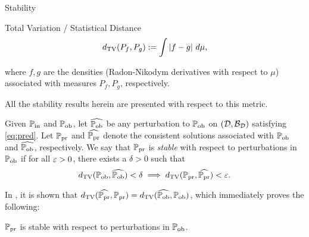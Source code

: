 \begin{frame}[t]{Stability}

\begin{defn}{Total Variation / Statistical Distance}
	\begin{equation}\label{eq:tv}
		d_{\text{TV}} (P_f, P_g) := \int \left\vert f - g\right\vert \, d\mu,
	\end{equation}
\end{defn}
where $f,g$ are the densities (Radon-Nikodym derivatives with respect to $\mu$) associated with measures $P_f, P_g$, respectively.

All the stability results herein are presented with respect to this metric.
\end{frame}

\begin{frame}[t]

\begin{defn}\label{defn:stableobs}
Given $\operatorname*{\mathbb{P}_{in}}$ and $\operatorname*{\mathbb{P}_{ob}}$, let $\widehat{\operatorname*{\mathbb{P}_{ob}}}$ be any perturbation to $\operatorname*{\mathbb{P}_{ob}}$ on $(\mathcal{D}, \mathcal{B}_{\mathcal{D}})$ satisfying \eqref{eq:pred}. 
Let $\operatorname*{\mathbb{P}_{pr}}$ and $\widehat{\operatorname*{\mathbb{P}_{pr}}}$ denote the consistent solutions associated with $\operatorname*{\mathbb{P}_{ob}}$ and $\widehat{\operatorname*{\mathbb{P}_{ob}}}$, respectively. 
We say that $\operatorname*{\mathbb{P}_{pr}}$ is \emph{stable} with respect to perturbations in $\operatorname*{\mathbb{P}_{ob}}$ if for all $\varepsilon > 0$, there exists a $\delta > 0$ such that
\begin{equation}
d_{\text{TV}} (\operatorname*{\mathbb{P}_{ob}}, \widehat{\operatorname*{\mathbb{P}_{ob}}}) < \delta \implies d_{\text{TV}} (\operatorname*{\mathbb{P}_{pr}}, \widehat{\operatorname*{\mathbb{P}_{pr}}}) < \varepsilon.
\end{equation}
\end{defn}

In \cite{BJW18}, it is shown that $d_{\text{TV}} (\widehat{\operatorname*{\mathbb{P}_{pr}}}, \operatorname*{\mathbb{P}_{pr}}) = d_{\text{TV}} (\widehat{\operatorname*{\mathbb{P}_{ob}}}, \operatorname*{\mathbb{P}_{ob}})$, which immediately proves the following:

\begin{theorem}
$\operatorname*{\mathbb{P}_{pr}}$ is stable with respect to perturbations in $\operatorname*{\mathbb{P}_{ob}}$.
\end{theorem}

\end{frame}

